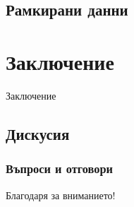 \documentclass{beamer}
\begin{document}
\subsection{Рамкирани данни}

\section{Заключение}

\begin{frame}
\center \huge{Заключение}
\end{frame}

\subsection{Дискусия}

\begin{frame}
\frametitle{Въпроси и отговори}
\center \huge{Благодаря за вниманието!}
\end{frame}
\end{document}
